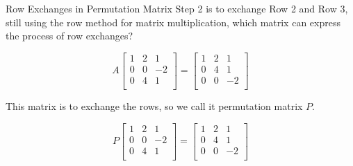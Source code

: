 \documentclass{beamer}
\begin{document}
\begin{frame}{Row Exchanges in Permutation Matrix}
Step 2 is to exchange Row 2 and Row 3, still using the row method for matrix multiplication, which matrix can express the process of row exchanges?

\begin{equation*}
    A\left[ \begin{matrix}
        1&		2&		1\\
        0&		0&		-2\\
        0&		4&		1\\
    \end{matrix} \right] =\left[ \begin{matrix}
        1&		2&		1\\
        0&		4&		1\\
        0&		0&		-2\\
    \end{matrix} \right]
\end{equation*}

This matrix is to exchange the rows, so we call it permutation matrix $P$.

\begin{equation*}
    P\left[ \begin{matrix}
        1&		2&		1\\
        0&		0&		-2\\
        0&		4&		1\\
    \end{matrix} \right] =\left[ \begin{matrix}
        1&		2&		1\\
        0&		4&		1\\
        0&		0&		-2\\
    \end{matrix} \right]
\end{equation*}

\end{frame}
\end{document}

